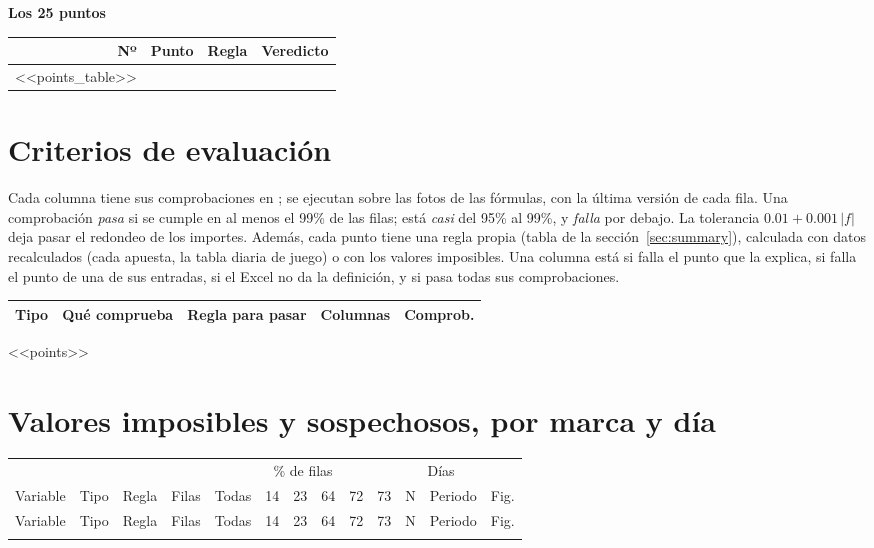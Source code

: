 \textbf{Los 25 puntos}

\begin{small}
\begin{longtable}{@{}r>{\raggedright\arraybackslash}p{4.2cm}>{\raggedright\arraybackslash}p{8.2cm}l@{}}
\toprule
Nº & Punto & Regla & Veredicto\\
\midrule
\endhead
\bottomrule
\endfoot
<<points_table>>
\end{longtable}
\end{small}

\section{Criterios de evaluación}\label{sec:criteria}
Cada columna tiene sus comprobaciones en ; se ejecutan sobre las fotos de las fórmulas, con la última versión de cada fila. Una comprobación \emph{pasa} si se cumple en al menos el 99\% de las filas; está \emph{casi} del 95\% al 99\%, y \emph{falla} por debajo. La tolerancia $0.01 + 0.001\,|f|$ deja pasar el redondeo de los importes. Además, cada punto tiene una regla propia (tabla de la sección~\ref{sec:summary}), calculada con datos recalculados (cada apuesta, la tabla diaria de juego) o con los valores imposibles. Una columna está \stWrong{} si falla el punto que la explica, \stAffected{} si falla el punto de una de sus entradas, \stUnconfirmed{} si el Excel no da la definición, y \stCorrect{} si pasa todas sus comprobaciones.

\begin{center}\small
\begin{tabular}{@{}>{\raggedright\arraybackslash}p{1.9cm}>{\raggedright\arraybackslash}p{5.8cm}>{\raggedright\arraybackslash}p{4.3cm}rr@{}}
\toprule
Tipo & Qué comprueba & Regla para pasar & Columnas & Comprob.\\
\midrule

\end{tabular}
\end{center}

<<points>>

\section{Valores imposibles y sospechosos, por marca y día}\label{sec:flags}
\begin{footnotesize}
\setlength{\tabcolsep}{2pt}
\begin{longtable}{@{}>{\raggedright\arraybackslash}p{2.5cm}l>{\raggedright\arraybackslash}p{2.1cm}rrrrrrrrlr@{}}
\toprule
& & & & \multicolumn{6}{c}{\% de filas} & \multicolumn{2}{c}{Días} & \\
\cmidrule(lr){5-10}\cmidrule(lr){11-12}
Variable & Tipo & Regla & Filas & Todas & 14 & 23 & 64 & 72 & 73 & N & Periodo & Fig.\\
\midrule
\endfirsthead
\toprule
Variable & Tipo & Regla & Filas & Todas & 14 & 23 & 64 & 72 & 73 & N & Periodo & Fig.\\
\midrule
\endhead
\bottomrule
\endfoot

\end{longtable}
\end{footnotesize}

